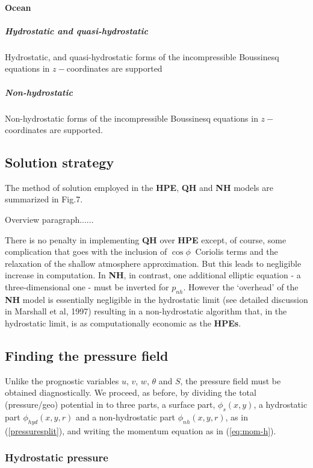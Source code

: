 \paragraph{Ocean}

\subparagraph{Hydrostatic and quasi-hydrostatic}

Hydrostatic, and quasi-hydrostatic forms of the incompressible Boussinesq
equations in $z-$coordinates are supported

\subparagraph{Non-hydrostatic }

Non-hydrostatic forms of the incompressible Boussinesq equations in $z-$
coordinates are supported.

\subsection{Solution strategy}

The method of solution employed in the \textbf{HPE}, \textbf{QH} and \textbf{
NH} models are summarized in Fig.7.

Overview paragraph......

There is no penalty in implementing \textbf{QH} over \textbf{HPE} except, of
course, some complication that goes with the inclusion of $\cos \phi \ $
Coriolis terms and the relaxation of the shallow atmosphere approximation.
But this leads to negligible increase in computation. In \textbf{NH}, in
contrast, one additional elliptic equation - a three-dimensional one - must
be inverted for $p_{nh}$. However the `overhead' of the \textbf{NH} model is
essentially negligible in the hydrostatic limit (see detailed discussion in
Marshall et al, 1997) resulting in a non-hydrostatic algorithm that, in the
hydrostatic limit, is as computationally economic as the \textbf{HPEs}.

\subsection{Finding the pressure field}

Unlike the prognostic variables $u$, $v$, $w$, $\theta $ and $S$, the
pressure field must be obtained diagnostically. We proceed, as before, by
dividing the total (pressure/geo) potential in to three parts, a surface
part, $\phi _{s}(x,y)$, a hydrostatic part $\phi _{hyd}(x,y,r)$ and a
non-hydrostatic part $\phi _{nh}(x,y,r)$, as in (\ref{pressuresplit}), and
writing the momentum equation
as in (\ref{eq:mom-h}).

\subsubsection{Hydrostatic pressure}

